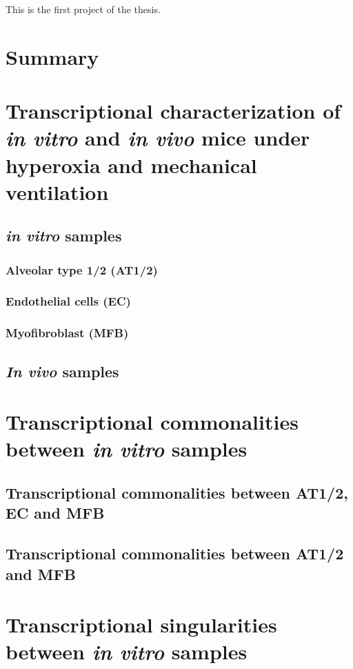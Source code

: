 This is the first project of the thesis.

\section{Summary}

\section{Transcriptional characterization of \textit{in vitro} and \textit{in vivo} mice under hyperoxia and mechanical ventilation}
    \subsection{\textit{in vitro} samples}
        \subsubsection{Alveolar type 1/2 (AT1/2)}
        \subsubsection{Endothelial cells (EC)}
        \subsubsection{Myofibroblast (MFB)}
    \subsection{\textit{In vivo} samples}

\section{Transcriptional commonalities between \textit{in vitro} samples}
    \subsection{Transcriptional commonalities between AT1/2, EC and MFB}
    \subsection{Transcriptional commonalities between AT1/2 and MFB}

\section{Transcriptional singularities between \textit{in vitro} samples}
